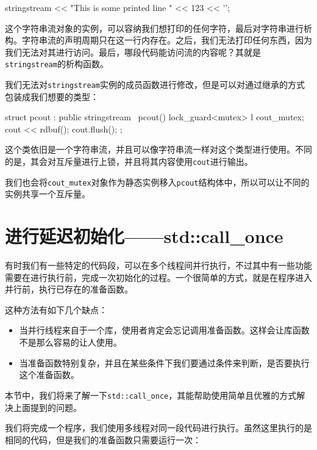 \begin{codebox}[cpp]
stringstream{} << "This is some printed line " << 123 << '\n';
\end{codebox}

这个字符串流对象的实例，可以容纳我们想打印的任何字符，最后对字符串进行析构。字符串流的声明周期只在这一行内存在。之后，我们无法打印任何东西，因为我们无法对其进行访问。最后，哪段代码能访问流的内容呢？其就是\texttt{stringstream}的析构函数。

我们无法对\texttt{stringstream}实例的成员函数进行修改，但是可以对通过继承的方式包装成我们想要的类型：

\begin{codebox}[cpp]
struct pcout : public stringstream {
    ~pcout() {
        lock_guard<mutex> l {cout_mutex};
        cout << rdbuf();
        cout.flush();
    }
};
\end{codebox}

这个类依旧是一个字符串流，并且可以像字符串流一样对这个类型进行使用。不同的是，其会对互斥量进行上锁，并且将其内容使用\texttt{cout}进行输出。

我们也会将\texttt{cout\_mutex}对象作为静态实例移入\texttt{pcout}结构体中，所以可以让不同的实例共享一个互斥量。


\section{进行延迟初始化——std::call\_once}

有时我们有一些特定的代码段，可以在多个线程间并行执行，不过其中有一些功能需要在进行执行前，完成一次初始化的过程。一个很简单的方式，就是在程序进入并行前，执行已存在的准备函数。

这种方法有如下几个缺点：

\begin{itemize}
\item 当并行线程来自于一个库，使用者肯定会忘记调用准备函数。这样会让库函数不是那么容易的让人使用。

\item 当准备函数特别复杂，并且在某些条件下我们要通过条件来判断，是否要执行这个准备函数。

\end{itemize}

本节中，我们将来了解一下\texttt{std::call\_once}，其能帮助使用简单且优雅的方式解决上面提到的问题。


我们将完成一个程序，我们使用多线程对同一段代码进行执行。虽然这里执行的是相同的代码，但是我们的准备函数只需要运行一次：


